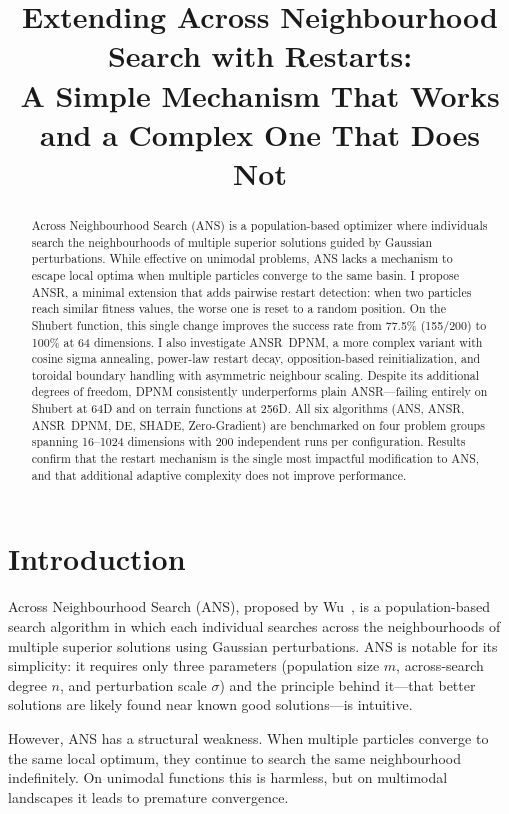 \documentclass[11pt,a4paper]{article}
\title{Extending Across Neighbourhood Search with Restarts:\\A Simple Mechanism That Works and a Complex One That Does Not}
\begin{document}
\maketitle

\begin{abstract}
Across Neighbourhood Search (ANS) is a population-based optimizer where individuals search the neighbourhoods of multiple superior solutions guided by Gaussian perturbations. While effective on unimodal problems, ANS lacks a mechanism to escape local optima when multiple particles converge to the same basin. I propose ANSR, a minimal extension that adds pairwise restart detection: when two particles reach similar fitness values, the worse one is reset to a random position. On the Shubert function, this single change improves the success rate from 77.5\% (155/200) to 100\% at 64 dimensions. I also investigate ANSR~DPNM, a more complex variant with cosine sigma annealing, power-law restart decay, opposition-based reinitialization, and toroidal boundary handling with asymmetric neighbour scaling. Despite its additional degrees of freedom, DPNM consistently underperforms plain ANSR---failing entirely on Shubert at 64D and on terrain functions at 256D. All six algorithms (ANS, ANSR, ANSR~DPNM, DE, SHADE, Zero-Gradient) are benchmarked on four problem groups spanning 16--1024 dimensions with 200 independent runs per configuration. Results confirm that the restart mechanism is the single most impactful modification to ANS, and that additional adaptive complexity does not improve performance.
\end{abstract}

\section{Introduction}

Across Neighbourhood Search (ANS), proposed by Wu~\cite{wu2015ans}, is a population-based search algorithm in which each individual searches across the neighbourhoods of multiple superior solutions using Gaussian perturbations. ANS is notable for its simplicity: it requires only three parameters (population size $m$, across-search degree $n$, and perturbation scale $\sigma$) and the principle behind it---that better solutions are likely found near known good solutions---is intuitive.

However, ANS has a structural weakness. When multiple particles converge to the same local optimum, they continue to search the same neighbourhood indefinitely. On unimodal functions this is harmless, but on multimodal landscapes it leads to premature convergence.
\end{document}
